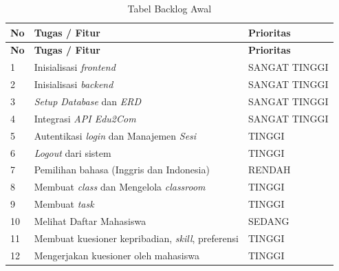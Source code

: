 \begin{longtable}{| b{}|p{}|p{}|}
	\caption{Tabel Backlog Awal}
	\label{table:3.backlog}                                                                                             \\
	\hline
	\textbf{No} & \textbf{Tugas / Fitur}                                                           & \textbf{Prioritas} \\
	\hline
	\endfirsthead
	\hline
	\textbf{No} & \textbf{Tugas / Fitur}                                                           & \textbf{Prioritas} \\
	\hline
	\endhead
	1           & Inisialisasi \textit{frontend}                                                   & SANGAT TINGGI      \\
	\hline
	2           & Inisialisasi \textit{backend}                                                    & SANGAT TINGGI      \\
	\hline
	3           & \textit{Setup Database} dan \textit{ERD}                                         & SANGAT TINGGI      \\
	\hline
	4           & Integrasi \textit{API Edu2Com}                                                   & SANGAT TINGGI      \\
	\hline
	5           & Autentikasi \textit{login} dan Manajemen \textit{Sesi}                           & TINGGI             \\
	\hline
	6           & \textit{Logout} dari sistem                                                      & TINGGI             \\
	\hline
	7           & Pemilihan bahasa (Inggris dan Indonesia)                                         & RENDAH             \\
	\hline
	8           & Membuat \textit{class} dan Mengelola \textit{classroom}                          & TINGGI             \\
	\hline
	9           & Membuat \textit{task}                                                            & TINGGI             \\
	\hline
	10          & Melihat Daftar Mahasiswa                                                         & SEDANG             \\
	\hline
	11          & Membuat kuesioner kepribadian, \textit{skill}, preferensi                        & TINGGI             \\
	\hline
	12          & Mengerjakan kuesioner oleh mahasiswa                                             & TINGGI             \\

\end{longtable}
